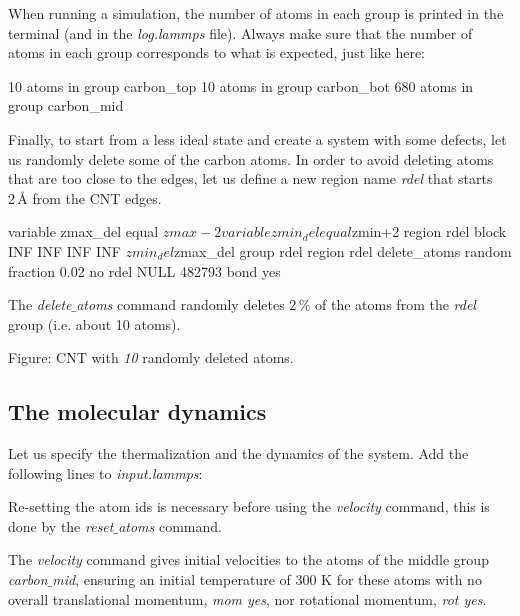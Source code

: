 \vspace{0.25cm} \noindent When running a simulation, the number of atoms in each group is printed in
the terminal (and in the \textit{log.lammps} file). Always make sure that the number
of atoms in each group corresponds to what is expected, just like here:

\begin{lcverbatim}
10 atoms in group carbon_top
10 atoms in group carbon_bot
680 atoms in group carbon_mid
\end{lcverbatim}

\noindent Finally, to start from a less ideal state and create a system with some defects, 
let us randomly delete some of the carbon atoms.
In order to avoid deleting atoms that are too close to the edges,
let us define a new region name \textit{rdel} that
starts $2\,Å$
from the CNT edges.

\begin{lcverbatim}
variable zmax_del equal ${zmax}-2
variable zmin_del equal ${zmin}+2
region rdel block INF INF INF INF ${zmin_del} ${zmax_del}
group rdel region rdel
delete_atoms random fraction 0.02 no rdel NULL 482793 bond yes
\end{lcverbatim}

\noindent The \textit{delete$\_$atoms} command randomly
deletes $2\,\%$ of the atoms
from the \textit{rdel} group (i.e. about 10 atoms).

\vspace{0.25cm} Figure: CNT with \textit{10} randomly deleted atoms. 

\subsection{The molecular dynamics}
\noindent Let us specify the thermalization and the dynamics of the
system. Add the following lines to \textit{input.lammps}:


\noindent Re-setting the atom ids is necessary before using the \textit{velocity} command,
this is done by the \textit{reset$\_$atoms} command.

\vspace{0.25cm} \noindent The \textit{velocity} command gives initial velocities to
the atoms of the middle group \textit{carbon$\_$mid}, ensuring an initial temperature
of 300 K for these atoms with no overall translational momentum, \textit{mom yes},
nor rotational momentum, \textit{rot yes}.

